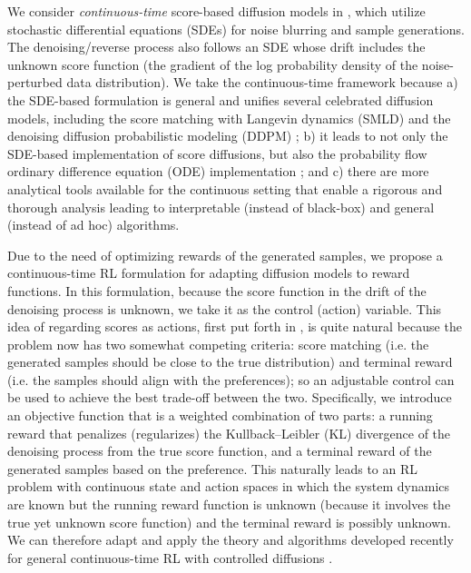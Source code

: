 \documentclass[11pt]{article}
\begin{document}
We consider \textit{continuous-time} score-based diffusion models in \cite{SongICLR2021}, which utilize stochastic differential equations (SDEs) for noise blurring and sample generations. The denoising/reverse process also follows an SDE whose drift includes the unknown score function (the gradient of the log probability density of the noise-perturbed data distribution). We take the continuous-time framework because a) the SDE-based formulation is general and unifies several celebrated diffusion models, including the score matching with Langevin dynamics (SMLD) \citep{SongErmon2019} and the denoising diffusion probabilistic modeling (DDPM) \citep{Ho2020}; b) it leads to not only the SDE-based implementation of score diffusions, but also the probability flow ordinary difference equation (ODE) implementation \citep{SongICLR2021}; and c) there are more analytical tools available for the continuous setting that enable a rigorous and thorough analysis leading to interpretable (instead of black-box) and general
(instead of ad hoc) algorithms.




Due to the need of optimizing rewards of the generated samples,
 we propose a continuous-time RL formulation for adapting diffusion models to reward functions. In this formulation, because the score function in the drift of the denoising process is unknown, we take it as the control (action) variable. This idea of regarding scores as actions, first put forth in \cite{uehara2024fine, tang2024score},
 is quite natural because the problem now has two somewhat competing criteria: score matching (i.e. the generated samples should be close to the true distribution) and terminal reward (i.e. the samples should align with the preferences); so an adjustable  control can be used to achieve the best trade-off between the two.
Specifically, we introduce an objective function that is a weighted combination of two parts: a running reward that penalizes (regularizes) the Kullback--Leibler (KL) divergence of the denoising process from the true score function, and
a terminal reward of the generated samples based on the preference.
This naturally leads to an RL problem with continuous state and action spaces in which the system dynamics are known but the running reward function is unknown (because it involves the true yet unknown score function) and the terminal reward is possibly unknown.
We can therefore adapt and apply the theory and algorithms developed recently for general continuous-time RL with controlled diffusions \citep{Wang20, JZ21, JZ22, jia2023q}.
\end{document}
